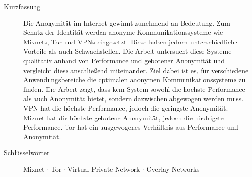 \begin{description}
    \item[Kurzfassung] Die Anonymität im Internet gewinnt zunehmend an Bedeutung. Zum Schutz der Identität werden anonyme Kommunikationssysteme wie Mixnets, Tor und VPNs eingesetzt. Diese haben jedoch unterschiedliche Vorteile als auch Schwachstellen. Die Arbeit untersucht diese Systeme qualitativ anhand von Performance und gebotener Anonymität und vergleicht diese anschließend miteinander. Ziel dabei ist es, für verschiedene Anwendungsbereiche die optimalen anonymen Kommunikationssysteme zu finden. Die Arbeit zeigt, dass kein System sowohl die höchste Performance als auch Anonymität bietet, sondern dazwischen abgewogen werden muss. VPN hat die höchste Performance, jedoch die geringste Anonymität. Mixnet hat die höchste gebotene Anonymität, jedoch die niedrigste Performance. Tor hat ein ausgewogenes Verhältnis aus Performance und Anonymität.
    \item[Schlüsselwörter] Mixnet $\cdot$ Tor $\cdot$ Virtual Private Network $\cdot$ Overlay Networks
\end{description}
